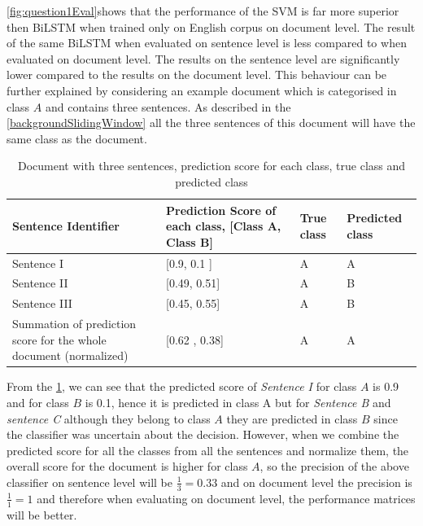 \ref{fig:question1Eval}shows that the performance of the SVM is far more superior then \gls{BiLSTM} when trained only on English corpus on document level. The result of the same \gls{BiLSTM} when evaluated on sentence level is less compared to when evaluated on document level. The results on the sentence level are significantly lower compared to the results on the document level. This behaviour can be further explained by considering an example document which is categorised in class $A$ and contains three sentences. As described in the \ref{backgroundSlidingWindow} all the three sentences of this document will have the same class as the document.
\begin{table}[!ht]
\centering
\begin{tabular}{>{\centering\arraybackslash}m{3cm}>{\centering\arraybackslash}m{3cm}>{\centering\arraybackslash}m{3cm}>{\centering\arraybackslash}m{3cm}}
\hline
\textbf{Sentence Identifier} & \textbf{Prediction Score of each class, [Class A, Class B]} & \textbf{True class} & \textbf{Predicted class} \\ \hline
Sentence I & {[}0.9, 0.1 {]} & A & A \\[0.2cm]
Sentence II & {[}0.49, 0.51{]} & A & B \\[0.2cm]
Sentence III & {[}0.45, 0.55{]} & A & B \\ [0.2cm]\hline
Summation of prediction score for the whole document (normalized) & {[}0.62 , 0.38{]} & A & A
\end{tabular}
\caption{Document with three sentences, prediction score for each class, true class and predicted class}
\label{table:SentVsDoc}
\end{table}

From the \ref{table:SentVsDoc}, we can see that the predicted score of \textit{Sentence I} for class $A$ is 0.9 and for class $B$ is 0.1, hence it is predicted in class A  but for \textit{Sentence B} and \textit{sentence C} although they belong to class $A$ they are predicted in class $B$ since the classifier was uncertain about the decision. However, when we combine the predicted score for all the classes from all the sentences and normalize them, the overall score for the document is higher for class $A$, so the precision of the above classifier on sentence level will be $\frac{1}{3} = 0.33$ and on document level the precision is $\frac{1}{1} = 1$ and therefore when evaluating on document level, the performance matrices will be better. 

